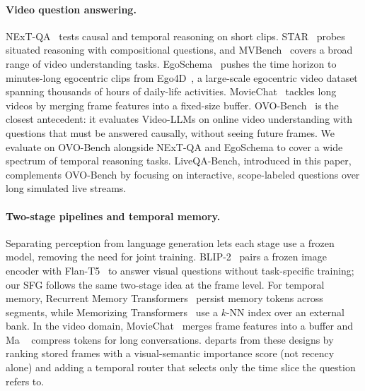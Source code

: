 \paragraph{Video question answering.}
NExT-QA~\cite{xiao2021nextqa} tests causal and temporal reasoning on short clips.
STAR~\cite{wu2021star} probes situated reasoning with compositional questions, and MVBench~\cite{li2024mvbench} covers a broad range of video understanding tasks.
EgoSchema~\cite{mangalam2023egoschema} pushes the time horizon to minutes-long egocentric clips from Ego4D~\cite{grauman2022ego4d}, a large-scale egocentric video dataset spanning thousands of hours of daily-life activities.
MovieChat~\cite{song2024moviechat} tackles long videos by merging frame features into a fixed-size buffer.
OVO-Bench~\cite{li2025ovobench} is the closest antecedent: it evaluates Video-LLMs on online video understanding with questions that must be answered causally, without seeing future frames.
We evaluate on OVO-Bench alongside NExT-QA and EgoSchema to cover a wide spectrum of temporal reasoning tasks.
LiveQA-Bench, introduced in this paper, complements OVO-Bench by focusing on interactive, scope-labeled questions over long simulated live streams.

\paragraph{Two-stage pipelines and temporal memory.}
Separating perception from language generation lets each stage use a frozen model, removing the need for joint training.
BLIP-2~\cite{li2023blip2} pairs a frozen image encoder with Flan-T5~\cite{chung2022flanT5} to answer visual questions without task-specific training; our SFG follows the same two-stage idea at the frame level.
For temporal memory, Recurrent Memory Transformers~\cite{bulatov2022recurrent} persist memory tokens across segments, while Memorizing Transformers~\cite{wu2022memorizing} use a $k$-NN index over an external bank.
In the video domain, MovieChat~\cite{song2024moviechat} merges frame features into a buffer and Ma \etal~\cite{ma2023livelylivechat} compress tokens for long conversations.
\ours departs from these designs by ranking stored frames with a visual-semantic importance score (not recency alone) and adding a temporal router that selects only the time slice the question refers to.

